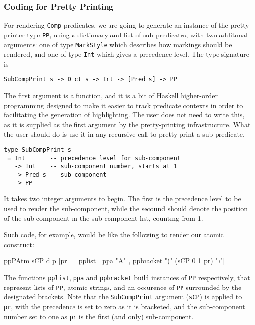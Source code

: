 \subsubsection{Coding for Pretty Printing}

For rendering \texttt{Comp} predicates, we are going to generate an instance
of the pretty-printer type \texttt{PP}, using a dictionary
and list of sub-predicates,
with two additonal arguments:
one of type \texttt{MarkStyle} which describes how markings should be rendered,
and one of type \texttt{Int} which gives a precedence level.
The type signature is
\begin{verbatim}
SubCompPrint s -> Dict s -> Int -> [Pred s] -> PP
\end{verbatim}
The first argument is a function,
and it is a bit of Haskell higher-order programming designed
to make it easier to track predicate contexts in order
to facilitating the generation of highlighting.
The user does not need to write this,
as it is supplied as the first argument by the pretty-printing
infrastructure.
What the user should do is use it in any recursive call
to pretty-print a sub-predicate.
\begin{verbatim}
type SubCompPrint s
 = Int       -- precedence level for sub-component
   -> Int    -- sub-component number, starts at 1
   -> Pred s -- sub-component
   -> PP
\end{verbatim}
It takes two integer arguments to begin.
The first is the precedence level to be used to render the
sub-component,
while the secound should denote the position of the sub-component
in the sub-component list, counting from 1.

Such code, for example, would be like the following
to render our atomic construct:
\begin{code}
ppPAtm sCP d p [pr]
 = pplist [ ppa "A"
          , ppbracket "(" (sCP 0 1 pr) ")"]
\end{code}
The functions \texttt{pplist}, \texttt{ppa} and \texttt{ppbracket}
build instances of \texttt{PP} respectively,
that represent lists of \texttt{PP},
atomic strings,
and an occurence of \texttt{PP} surrounded by the designated brackets.
Note that the \texttt{SubCompPrint} argument (\texttt{sCP})
is applied to \texttt{pr},
with the precedence is set to zero as it is bracketed,
and the sub-component number set to one as \texttt{pr} is the first
(and only) sub-component.




